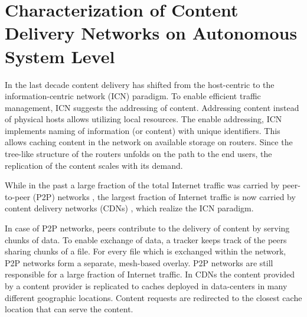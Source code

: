 \chapter{Characterization of Content Delivery Networks on Autonomous System Level}\label{chap:aslevel}

In the last decade content delivery has shifted from the host-centric to the information-centric network (ICN) paradigm.
To enable efficient traffic management, ICN suggests the addressing of content.
Addressing content instead of physical hosts allows utilizing local resources.
The enable addressing, ICN implements naming of information (or content) with unique identifiers.
This allows caching content in the network on available storage on routers.
Since the tree-like structure of the routers unfolds on the path to the end users, the replication of the content scales with its demand.

While in the past a large fraction of the total Internet traffic was carried by peer-to-peer (P2P) networks \cite{Cisc09}, the largest fraction of Internet traffic is now carried by content delivery networks (CDNs) \cite{cisco2016}, which realize the ICN paradigm.

In case of P2P networks, peers contribute to the delivery of content by serving chunks of data.
To enable exchange of data, a tracker keeps track of the peers sharing chunks of a file.
For every file which is exchanged within the network, P2P networks form a separate, mesh-based overlay.
P2P networks are still responsible for a large fraction of Internet traffic.
In CDNs the content provided by a content provider is replicated to caches deployed in data-centers in many different geographic locations.
Content requests are redirected to the closest cache location that can serve the content.

